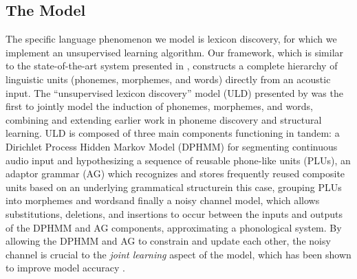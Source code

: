 \documentclass[12pt,letterpaper]{article}
\begin{document}
\subsection{The Model}
The specific language phenomenon we model is lexicon discovery, for which we implement an unsupervised learning algorithm. Our framework, which is similar to the state-of-the-art system presented in \citet{lee:2015}, constructs a complete hierarchy of linguistic units (phonemes, morphemes, and words) directly from an acoustic input. The ``unsupervised lexicon discovery'' model (ULD) presented by \citet{lee:2015} was the first to jointly model the induction of phonemes, morphemes, and words, combining and extending earlier work in phoneme discovery and structural learning. ULD is composed of three main components functioning in tandem: a Dirichlet Process Hidden Markov Model (DPHMM) \citep{lee:2012} for segmenting continuous audio input and hypothesizing a sequence of reusable phone-like units (PLUs), an adaptor grammar (AG) \citep{johnson:2007} which recognizes and stores frequently reused composite units based on an underlying grammatical structure\textemdash in this case, grouping PLUs into morphemes and words\textemdash and finally a noisy channel model, which allows substitutions, deletions, and insertions to occur between the inputs and outputs of the DPHMM and AG components, approximating a phonological system. By allowing the DPHMM and AG to constrain and update each other, the noisy channel is crucial to the \textit{joint learning} aspect of the model, which has been shown to improve model accuracy \citep{johnson:2008}. 
\end{document}
